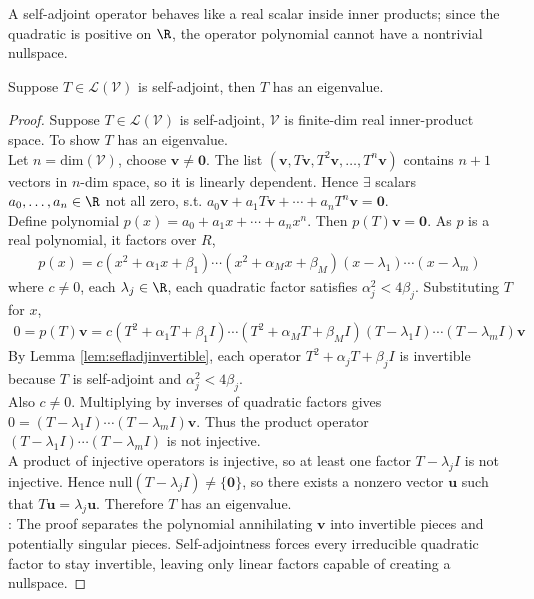 A self-adjoint operator behaves like a real scalar inside inner products; since the quadratic is positive on $\R$, the operator polynomial cannot have a nontrivial nullspace.

\begin{lemma} Suppose $T \in \mathcal{L}(\mathcal{V})$ is self-adjoint, then $T$ has an eigenvalue.
\begin{proof} Suppose $T \in \mathcal{L}(\mathcal{V})$ is self-adjoint, $\mathcal{V}$ is finite-dim real inner-product space. To show $T$ has an eigenvalue.\\
Let $n = \text{dim}(\mathcal{V})$, choose $\mathbf{v} \neq \mathbf{0}$. The list $(\mathbf{v}, T\mathbf{v}, T^2 \mathbf{v}, \ldots, T^n \mathbf{v})$ contains $n+1$ vectors in $n$-dim space, so it is linearly dependent. Hence $\exists$ scalars $a_0, \ldots, a_n \in \R$ not all zero, s.t. $a_0 \mathbf{v} + a_1 T \mathbf{v} + \cdots + a_n T^n \mathbf{v} = \mathbf{0}$.\\
Define polynomial $p(x) = a_0 + a_1 x + \cdots + a_n x^n$. Then $p(T) \mathbf{v} = \mathbf{0}$. As $p$ is a real polynomial, it factors over $R$,
\begin{align}
p(x) = c(x^2 + \alpha_1 x + \beta_1) \cdots (x^2 + \alpha_M x + \beta_M)(x - \lambda_1) \cdots (x - \lambda_m) \nonumber
\end{align}
where $c \neq 0$, each $\lambda_j \in \R$, each quadratic factor satisfies $\alpha_j^2 < 4 \beta_j$. Substituting $T$ for $x$,
\begin{align}
0 = p(T) \mathbf{v} = c(T^2 + \alpha_1 T + \beta_1 I) \cdots (T^2 + \alpha_M T + \beta_M I) (T - \lambda_1 I) \cdots (T - \lambda_m I) \mathbf{v} \nonumber
\end{align}
By Lemma \ref{lem:sefladjinvertible}, each operator $T^2 + \alpha_j T + \beta_j I$ is invertible because $T$ is self-adjoint and $\alpha_j^2 < 4 \beta_j$.\\
Also $c \neq 0$. Multiplying by inverses of quadratic factors gives $0 = (T - \lambda_1 I) \cdots (T - \lambda_m I)\mathbf{v}$. Thus the product operator $(T - \lambda_1 I) \cdots (T - \lambda_m I)$ is not injective.\\
A product of injective operators is injective, so at least one factor $T - \lambda_j I$ is not injective. Hence $\text{null}(T - \lambda_j I) \neq \{ \mathbf{0} \}$, so there exists a nonzero vector $\mathbf{u}$ such that $T \mathbf{u} = \lambda_j \mathbf{u}$. Therefore $T$ has an eigenvalue.\\
: The proof separates the polynomial annihilating $\mathbf{v}$ into invertible pieces and potentially singular pieces. Self-adjointness forces every irreducible quadratic factor to stay invertible, leaving only linear factors capable of creating a nullspace.
\end{proof}
\end{lemma}

